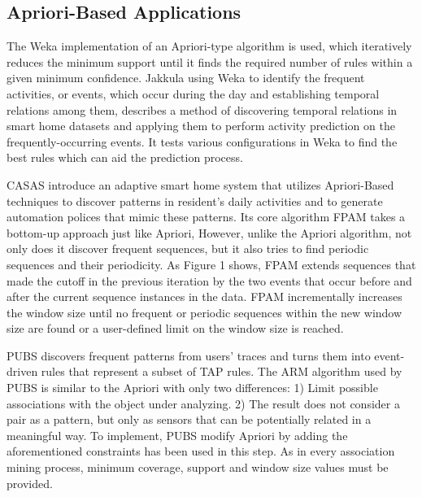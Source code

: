 \documentclass[sigplan, screen]{acmart}
\begin{document}
\subsection{Apriori-Based Applications}
The Weka\cite{witten2005practical} implementation of an Apriori-type algorithm is used, which iteratively reduces the 
minimum support until it finds the required number of rules 
within a given minimum confidence. Jakkula\cite{jakkula2007learning, jakkula2007mining} using Weka to identify the frequent 
activities, or events, which occur during the day and establishing temporal relations among them, describes a method of discovering temporal relations 
in smart home datasets and applying them to perform activity prediction on the frequently-occurring events. It tests
various configurations in Weka to find the best rules which can aid the prediction process.

CASAS\cite{rashidi2009keeping} introduce an adaptive smart
home system that utilizes Apriori-Based techniques to discover
patterns in resident’s daily activities and to generate automation
polices that mimic these patterns. Its core algorithm FPAM takes a bottom-up
approach just like Apriori, However, unlike the Apriori algorithm, not only
does it discover frequent sequences, but it also tries to find
periodic sequences and their periodicity. As Figure 1 shows, FPAM extends sequences that made the cutoff in the
previous iteration by the two events that occur before and after
the current sequence instances in the data. FPAM
incrementally increases the window size until no frequent or
periodic sequences within the new window size are found or a
user-defined limit on the window size is reached.

PUBS\cite{aztiria2012discovering} discovers frequent patterns from users’ traces and turns them
into event-driven rules that represent a subset of TAP rules. The ARM algorithm used by PUBS is similar to the
Apriori with only two differences: 1) Limit possible associations with the object under analyzing. 2) The result 
does not consider a pair as a pattern, but only as sensors that can be potentially related in a meaningful way. To implement,
PUBS modify Apriori by adding the aforementioned constraints has been
used in this step. As in every association mining process, minimum coverage, support
and window size values must be provided.
\end{document}
